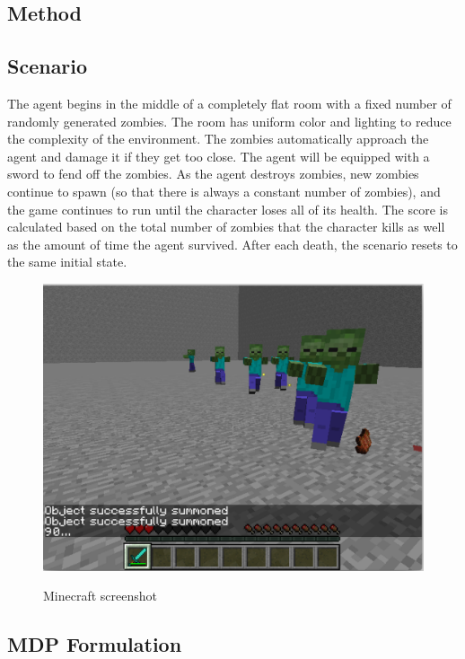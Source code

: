 \documentclass{article}
\begin{document}
\begin{multicols}{2}
\section{Method}


\subsection{Scenario}

The agent begins in the middle of a completely flat room with a fixed number of randomly generated zombies. The room has uniform color and lighting to reduce the complexity of the environment. The zombies automatically approach the agent and damage it if they get too close. The agent will be equipped with a sword to fend off the zombies. As the agent destroys zombies, new zombies continue to spawn (so that there is always a constant number of zombies), and the game continues to run until the character loses all of its health. The score is calculated based on the total number of zombies that the character kills as well as the amount of time the agent survived. After each death, the scenario resets to the same initial state.

\begin{figure}[H]
\caption{Minecraft screenshot}
\centering
\includegraphics[scale=0.3]{./aashiq_screenshot.png}
\label{fig:screenShot}
\end{figure}

\subsection{MDP Formulation}


\end{multicols}
\end{document}
